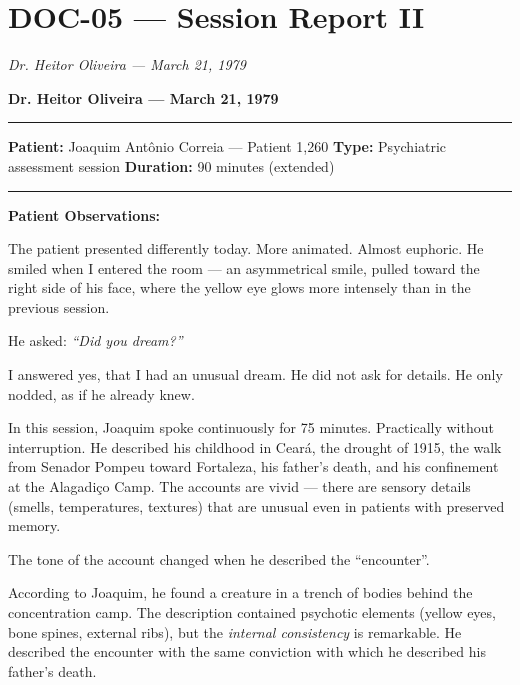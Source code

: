 \section*{\textbf{DOC-05} --- Session Report II}

\noindent \textit{Dr. Heitor Oliveira --- March 21, 1979}

\noindent \textbf{Dr. Heitor Oliveira --- March 21, 1979}

\vspace{0.5em}\noindent\rule{\textwidth}{0.5pt}\vspace{0.5em}

\noindent \textbf{Patient:} Joaquim Antônio Correia --- Patient 1,260
\textbf{Type:} Psychiatric assessment session
\textbf{Duration:} 90 minutes (extended)

\vspace{0.5em}\noindent\rule{\textwidth}{0.5pt}\vspace{0.5em}

\noindent \textbf{Patient Observations:}

\noindent The patient presented differently today. More animated. Almost euphoric. He smiled when I entered the room --- an asymmetrical smile, pulled toward the right side of his face, where the yellow eye glows more intensely than in the previous session.

\noindent He asked: \textit{\textquotedblleft{}Did you dream?\textquotedblright{}}

\noindent I answered yes, that I had an unusual dream. He did not ask for details. He only nodded, as if he already knew.

\noindent In this session, Joaquim spoke continuously for 75 minutes. Practically without interruption. He described his childhood in Ceará, the drought of 1915, the walk from Senador Pompeu toward Fortaleza, his father's death, and his confinement at the Alagadiço Camp. The accounts are vivid --- there are sensory details (smells, temperatures, textures) that are unusual even in patients with preserved memory.

\noindent The tone of the account changed when he described the \textquotedblleft{}encounter\textquotedblright{}.

\noindent According to Joaquim, he found a creature in a trench of bodies behind the concentration camp. The description contained psychotic elements (yellow eyes, bone spines, external ribs), but the \textit{internal consistency} is remarkable. He described the encounter with the same conviction with which he described his father's death.

